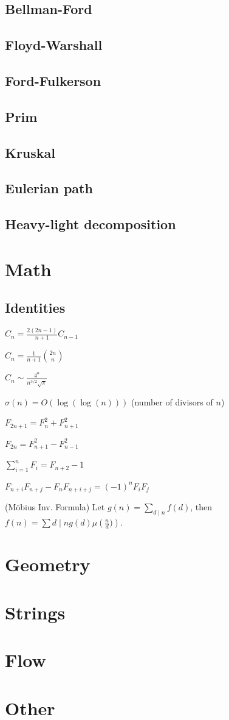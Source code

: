 \subsection{ Bellman-Ford }
\subsection{ Floyd-Warshall }
\subsection{ Ford-Fulkerson }
\subsection{ Prim }
\subsection{ Kruskal }
\subsection{ Eulerian path }
\subsection{ Heavy-light decomposition }

\section{Math}
\subsection{Identities}
{
	$C_n = \frac{2(2n-1)}{n+1} C_{n-1}$

	$C_n = \frac{1}{n+1} \binom{2n}{n}$

	$C_n \sim \frac{4^n}{n^{3/2}\sqrt{\pi}}$

	$\sigma(n) = O(\log(\log(n)))$ (number of divisors of $n$)

	$F_{2n+1} = F_{n}^2 + F_{n+1}^2$

	$F_{2n} = F_{n+1}^2 - F_{n-1}^2$

	$\sum_{i=1}^n F_i = F_{n+2}-1$

	$F_{n+i}F_{n+j} - F_nF_{n+i+j} = (-1)^n F_iF_j$

	(Möbius Inv. Formula)
	Let $g(n) = \sum_{d\mid n} f(d)$, then $f(n)=\sum{d\mid n} g(d) \mu\left(\frac{n}{d})\right)$.
}

\section{Geometry}
\section{Strings}

\section{Flow}

\section{Other}


